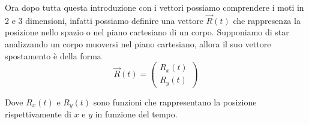 \documentclass{rapport}
\begin{document}
Ora dopo tutta questa introduzione con i vettori possiamo comprendere i moti in 2 e 3 dimensioni, infatti possiamo definire una vettore $\vec{R}(t)$ che rappresenza la posizione nello  spazio o nel piano cartesiano di un corpo. Supponiamo di star analizzando un corpo muoversi nel piano cartesiano, allora il suo vettore spostamento è della forma 
\[
\vec{R}(t) = \begin{pmatrix}
  R_x(t) \\
  R_y(t)
\end{pmatrix}
\]  

Dove $R_x(t)$  e $R_y(t)$ sono funzioni che rappresentano la posizione rispettivamente di $x$ e $y$ in funzione del tempo. 
\begin{figure}[htbp]
    \centering
\end{figure}
\end{document}
